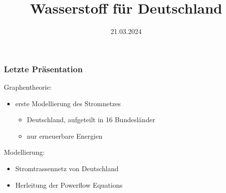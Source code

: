 \documentclass[aspectratio=169,t]{beamer}
\title{Wasserstoff für Deutschland}
\subtitle{}
\date{21.03.2024}
\author{}
\begin{document}
	
	\maketitle
	
	
	

	
	\begin{frame}
		\frametitle{Letzte Präsentation}
		\vspace*{-4mm}
		\begin{minipage}{1\linewidth}
			\begin{minipage}{.5\linewidth}
				
			Graphentheorie:
				
		\begin{itemize}
			\item erste Modellierung des Stromnetzes
			
			\begin{itemize}
				\item Deutschland, aufgeteilt in 16 Bundesländer 
				
				\item nur erneuerbare Energien
			\end{itemize}
			\vspace*{2mm}
			
			
			\end{itemize}
		\vspace*{2mm}
		
		Modellierung:
		\begin{itemize}
			\vspace*{2mm}
		\item Stromtrassennetz von Deutschland
		\vspace*{2mm}
		\item Herleitung der Powerflow Equations
		
		\end{itemize}
	\end{minipage}
\hfill
\begin{minipage}{.6\linewidth}
	
\centering


\end{minipage}
\end{minipage}
\end{frame}
\end{document}
